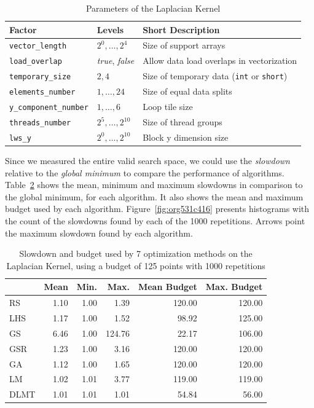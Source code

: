 \documentclass[conference]{IEEEtran}
\begin{document}
\begin{table}[t]
\caption{\label{tab:orgce1ecd2}
Parameters of the Laplacian Kernel}
\centering
\scriptsize
\begin{tabular}{llp{}}
\toprule
Factor & Levels & Short Description\\
\midrule
\texttt{vector\_length} & \(2^0,\dots,2^4\) & Size of support arrays\\
\texttt{load\_overlap} & \textit{true}, \textit{false} & Allow data load overlaps in vectorization\\
\texttt{temporary\_size} & \(2,4\) & Size of temporary data (\texttt{int} or \texttt{short})\\
\texttt{elements\_number} & \(1,\dots,24\) & Size of equal data splits\\
\texttt{y\_component\_number} & \(1,\dots,6\) & Loop tile size\\
\texttt{threads\_number} & \(2^5,\dots,2^{10}\) & Size of thread groups\\
\texttt{lws\_y} & \(2^0,\dots,2^{10}\) & Block y dimension size\\
\bottomrule
\end{tabular}
\end{table}

Since we measured the entire valid search space, we could use the \emph{slowdown}
relative to the \emph{global minimum} to compare the performance of algorithms.
Table~\ref{tab:gpu_laplacian_compare_budget} shows the mean, minimum and
maximum slowdowns in comparison to the global minimum, for each algorithm. It
also shows the mean and maximum budget used by each algorithm.
Figure~\ref{fig:org531c416} presents histograms with the
count of the slowdowns found by each of the 1000 repetitions. Arrows point the
maximum slowdown found by each algorithm.

\begin{table}[b]
\centering
\caption{Slowdown and budget used by 7 optimization methods on the Laplacian Kernel, using a budget of 125 points with 1000 repetitions}
\label{tab:gpu_laplacian_compare_budget}
\begingroup\footnotesize
\begin{tabular}{lrrrrr}
  \toprule
 & Mean & Min. & Max. & Mean Budget & Max. Budget \\
  \midrule
RS & 1.10 & 1.00 & 1.39 & 120.00 & 120.00 \\
  LHS & 1.17 & 1.00 & 1.52 & 98.92 & 125.00 \\
  GS & 6.46 & 1.00 & 124.76 & 22.17 & 106.00 \\
  GSR & 1.23 & 1.00 & 3.16 & 120.00 & 120.00 \\
  GA & 1.12 & 1.00 & 1.65 & 120.00 & 120.00 \\
  LM & 1.02 & 1.01 & 3.77 & 119.00 & 119.00 \\
   \rowcolor{red!25}DLMT & 1.01 & 1.01 & 1.01 & 54.84 & 56.00 \\
   \bottomrule
\end{tabular}
\endgroup
\end{table}
\end{document}
